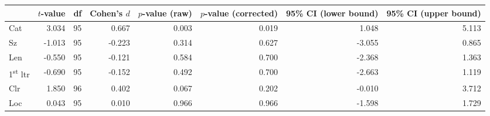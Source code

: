 \begin{tabular}{lrrrrrrr}
\toprule
 & $t$-value & df & Cohen's $d$ & $p$-value (raw) & $p$-value (corrected) & 95\% CI (lower bound) & 95\% CI (upper bound) \\
\midrule
\rowcolor[HTML]{fffee3} Cat & 3.034 & 95 & 0.667 & 0.003 & 0.019 & 1.048 & 5.113 \\
 Sz & -1.013 & 95 & -0.223 & 0.314 & 0.627 & -3.055 & 0.865 \\
 Len & -0.550 & 95 & -0.121 & 0.584 & 0.700 & -2.368 & 1.363 \\
 1\textsuperscript{st} ltr & -0.690 & 95 & -0.152 & 0.492 & 0.700 & -2.663 & 1.119 \\
 Clr & 1.850 & 96 & 0.402 & 0.067 & 0.202 & -0.010 & 3.712 \\
 Loc & 0.043 & 95 & 0.010 & 0.966 & 0.966 & -1.598 & 1.729 \\
\bottomrule
\end{tabular}